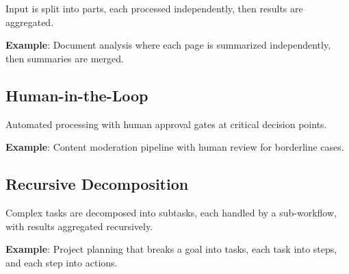 Input is split into parts, each processed independently, then results are aggregated.

\textbf{Example}: Document analysis where each page is summarized independently, then summaries are merged.

\subsection{Human-in-the-Loop}

Automated processing with human approval gates at critical decision points.

\textbf{Example}: Content moderation pipeline with human review for borderline cases.

\subsection{Recursive Decomposition}

Complex tasks are decomposed into subtasks, each handled by a sub-workflow, with results aggregated recursively.

\textbf{Example}: Project planning that breaks a goal into tasks, each task into steps, and each step into actions.

